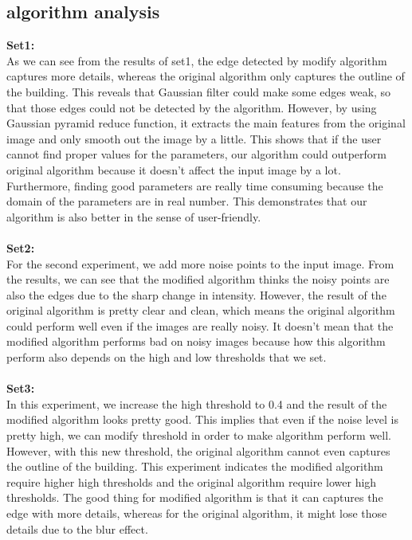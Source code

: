 \documentclass[10pt,twocolumn,letterpaper]{article}
\begin{document}
\subsection{algorithm analysis}
\textbf{Set1:}\\
As we can see from the results of set1, the edge detected by modify algorithm captures more details, whereas the original algorithm only captures the outline of the building. This reveals that Gaussian filter could make some edges weak, so that those edges could not be detected by the algorithm. However, by using Gaussian pyramid reduce function, it extracts the main features from the original image and only smooth out the image by a little. This shows that if the user cannot find proper values for the parameters, our algorithm could outperform original algorithm because it doesn't affect the input image by a lot. Furthermore, finding good parameters are really time consuming because the domain of the parameters are in real number. This demonstrates that our algorithm is also better in the sense of user-friendly.\\
\\
\textbf{Set2:}\\
For the second experiment, we add more noise points to the input image. From the results, we can see that the modified algorithm thinks the noisy points are also the edges due to the sharp change in intensity. However, the result of the original algorithm is pretty clear and clean, which means the original algorithm could perform well even if the images are really noisy. It doesn't mean that the modified algorithm performs bad on noisy images because how this algorithm perform also depends on the high and low thresholds that we set.\\
\\
\textbf{Set3:}\\
In this experiment, we increase the high threshold to 0.4 and the result of the modified algorithm looks pretty good. This implies that even if the noise level is pretty high, we can modify threshold in order to make algorithm perform well. However, with this new threshold, the original algorithm cannot even captures the outline of the building. This experiment indicates the modified algorithm require higher high thresholds and the original algorithm require lower high thresholds. The good thing for modified algorithm is that it can captures the edge with more details, whereas for the original algorithm, it might lose those details due to the blur effect. 
\end{document}
